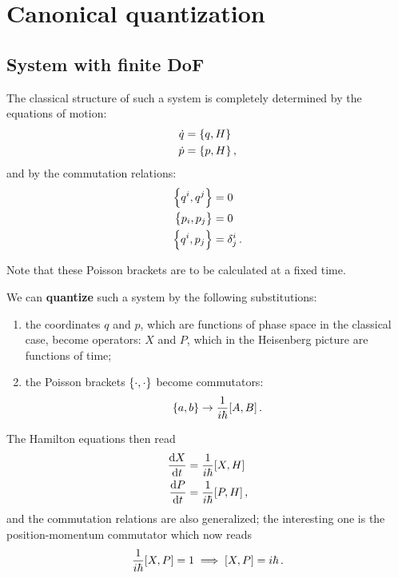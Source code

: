 \documentclass[main.tex]{subfiles}
\begin{document}
\section{Canonical quantization}

\subsection{System with finite DoF}


The classical structure of such a system is completely determined by the equations of motion: 
%
\begin{subequations}
\begin{align}
\dot{q} &= \qty{q, H}  \\
\dot{p} &= \qty{p, H}
\,,
\end{align}
\end{subequations}
%
and by the commutation relations: 
%
\begin{subequations}
\begin{align}
\qty{q^{i}, q^{j}} &= 0  \\
\qty{p_{i}, p_{j}} &= 0  \\
\qty{q^{i}, p_{j}} &= \delta_{j}^{i}
\,.
\end{align}
\end{subequations}

Note that these Poisson brackets are to be calculated at a fixed time. 

We can \textbf{quantize} such a system by the following substitutions: 
\begin{enumerate}
    \item the coordinates \(q\) and \(p\), which are functions of phase space in the classical case, become operators: \(X\) and \(P\), which in the Heisenberg picture are functions of time;
    \item the Poisson brackets \(\qty{\cdot, \cdot}\) become commutators: 
    \begin{align}
    \qty{a, b} \to \frac{1}{i \hbar} \qty[A, B]
    \,.
    \end{align}    
\end{enumerate}

The Hamilton equations then read 
%
\begin{subequations}
\begin{align}
\dv{X}{t} &= \frac{1}{i \hbar} \qty[X, H] \\
\dv{P}{t} &= \frac{1}{i \hbar} \qty[P, H]
\,,
\end{align}
\end{subequations}
%
and the commutation relations are also generalized; the interesting one is the position-momentum commutator which now reads 
%
\begin{align}
\frac{1}{i \hbar} \qty[X,P] = 1 \implies
\qty[X, P] = i \hbar
\,.
\end{align}
\end{document}
